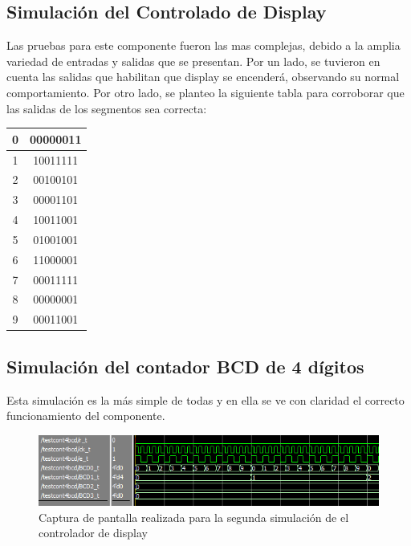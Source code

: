 \documentclass[a4paper,10pt]{article}
\begin{document}
	\subsection{Simulación del Controlado de Display}
	Las pruebas para este componente fueron las mas complejas, debido a la amplia variedad de entradas y salidas que se presentan. Por un lado, se tuvieron en cuenta las salidas que habilitan que display se encenderá, observando su normal comportamiento. Por otro lado, se planteo la siguiente tabla para corroborar que las salidas de los segmentos sea correcta:
		\begin{center}
			\begin{tabular}{|c|c|}
				\hline
				0 & 00000011 \\ \hline
				1 & 10011111 \\ \hline
				2 & 00100101 \\ \hline
				3 & 00001101 \\ \hline
				4 & 10011001 \\ \hline
				5 & 01001001 \\ \hline
				6 & 11000001 \\ \hline
				7 & 00011111 \\ \hline
				8 & 00000001 \\ \hline
				9 & 00011001 \\ \hline
			\end{tabular}
		\end{center}
	\subsection{Simulación del contador BCD de 4 dígitos}
	Esta simulación es la más simple de todas y en ella se ve con claridad el correcto funcionamiento del componente.
	\begin{figure}[H]
		\centering
		\includegraphics[scale=0.5]{sim-cont.png}
		\caption{Captura de pantalla realizada para la segunda simulación de el controlador de display}
		\label{fig:sim_cont}
	\end{figure}
	
\end{document}
